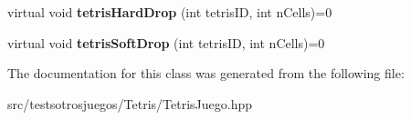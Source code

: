 \begin{DoxyCompactItemize}
\item 
virtual void {\bfseries tetris\+Hard\+Drop} (int tetris\+ID, int n\+Cells)=0\hypertarget{class_interfaz_juego_tetris_a68d6072ed1da605ee7e9bedddd74aaec}{}\label{class_interfaz_juego_tetris_a68d6072ed1da605ee7e9bedddd74aaec}

\item 
virtual void {\bfseries tetris\+Soft\+Drop} (int tetris\+ID, int n\+Cells)=0\hypertarget{class_interfaz_juego_tetris_a6519b3f35542a3df94379719def0b9ce}{}\label{class_interfaz_juego_tetris_a6519b3f35542a3df94379719def0b9ce}

\end{DoxyCompactItemize}


The documentation for this class was generated from the following file\+:\begin{DoxyCompactItemize}
\item 
src/testsotrosjuegos/\+Tetris/Tetris\+Juego.\+hpp\end{DoxyCompactItemize}
